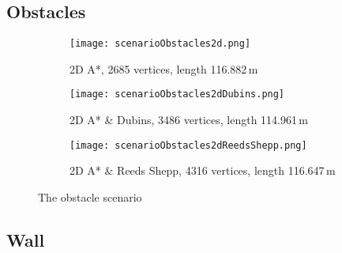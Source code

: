 \subsection{Obstacles}

\begin{figure}[h]
    \centering
    \begin{subfigure}[t]{\textwidth}
        \texttt{[image: scenarioObstacles2d.png]}
        \caption{2D A*, 2685 vertices, length 116.882\,m}
        \label{fig:scenarioObstacles2d}
    \end{subfigure}
    \begin{subfigure}[t]{\textwidth}
        \texttt{[image: scenarioObstacles2dDubins.png]}
        \caption{2D A* \& Dubins, 3486 vertices, length 114.961\,m}
        \label{fig:scenarioObstacles2dDubins}
    \end{subfigure}    
    \begin{subfigure}[t]{\textwidth}
        \texttt{[image: scenarioObstacles2dReedsShepp.png]}
        \caption{2D A* \& Reeds Shepp, 4316 vertices, length 116.647\,m}
        \label{fig:scenarioObstacles2dReedsShepp}
    \end{subfigure}
    \caption{The obstacle scenario}
    \label{fig:scenarioObstacle}
\end{figure}

\subsection{Wall}


